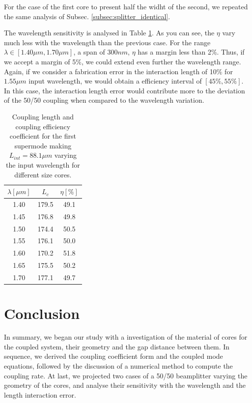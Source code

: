\documentclass[conference, a4paper]{IEEEtran}
\begin{document}
For the case of the first core to present half the widht of the second, we repeated the same analysis of Subsec. \ref{subsec:splitter_identical}. 


The wavelength sensitivity is analysed in Table \ref{tab:splitter_doubled_lc}. As you can see, the $\eta$ vary much less with the wavelength than the previous case. For the range $\lambda \in [1.40 \mu m, 1.70 \mu m]$, a span of $300nm$, $\eta$ has a margin less than 2\%. Thus, if we accept a margin of 5\%, we could extend even further the wavelength range. Again, if we consider a fabrication error in the interaction length of 10\% for $1.55\mu m$ input wavelength, we would obtain a efficiency interval of $[45\%, 55\%]$. In this case, the interaction length error would contribute more to the deviation of the 50/50 coupling when compared to the wavelength variation.

\begin{table}[H]
    \centering
    \begin{tabular}{ccc}
        \toprule
        $\lambda [\mu m]$ & $L_c$ & $\eta[\%]$ \\
        \midrule
        1.40 & 179.5 & 49.1 \\
        1.45 & 176.8 & 49.8 \\
        1.50 & 174.4 & 50.5 \\
        1.55 & 176.1 & 50.0 \\
        1.60 & 170.2 & 51.8 \\
        1.65 & 175.5 & 50.2 \\
        1.70 & 177.1 & 49.7 \\    
        \bottomrule
    \end{tabular}
    \caption{Coupling length and coupling efficiency coefficient for the first supermode making $L_{int} = 88.1\mu m$ varying the input wavelength for different size cores.}
    \label{tab:splitter_doubled_lc}
\end{table}

\section{Conclusion}
\label{sec:conclusion}

In summary, we began our study with a investigation of the material of cores for the coupled system, their geometry and the gap distance between them. In sequence, we derived the coupling coefficient form and the coupled mode equations, followed by the discussion of a numerical method to compute the coupling rate. At last, we projected two cases of a 50/50 beamplitter varying the geometry of the cores, and analyse their sensitivity with the wavelength and the length interaction error.

% 
% 

\end{document}
